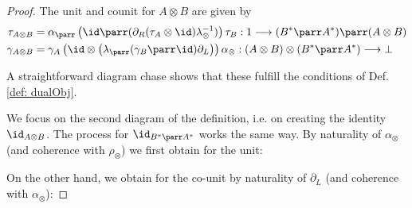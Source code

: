 \documentclass[DIN, pagenumber=false, fontsize=11pt, parskip=half, colorinlistoftodos, svgnames]{scrartcl}
\begin{document}
	\begin{proof}
		The unit and counit for $A \otimes B$ are given by 
		\begin{align*}
			\tau_{A\otimes B} 
			&= 
			\alpha_\parr
			\left(
				\id \parr (\partial_R(\tau_A \otimes \id)\lambda_\otimes^{-1}) 
			\right)
			\tau_B : 
			1 \longrightarrow (B^* \parr A^*) \parr (A \otimes B) 
			\\
			\gamma_{A \otimes B} 
			&= 
			\gamma_A 
			\left(
				\id \otimes 
				\left(
					\lambda_\parr (\gamma_B \parr \id) \partial_L 
				\right)
			\right)
			\alpha_\otimes :
			(A \otimes B) \otimes (B^* \parr A^*) \longrightarrow \bot
		\end{align*}
		
		A straightforward diagram chase shows that these fulfill the conditions of Def. \ref{def: dualObj}.
		
		We focus on the second diagram of the definition, i.e. on creating the identity $\id_{A \otimes B} $. The process for $\id_{B^* \parr A^*} $ works the same way.
		By  naturality of $\alpha_\otimes $ (and coherence with $\rho_\otimes$) we first obtain for the unit:
		
		\begin{center}
		\end{center}
		
		On the other hand, we obtain for the co-unit by naturality of $\partial_L$ (and coherence with $\alpha_\otimes$):
		

\end{proof}
\end{document}
